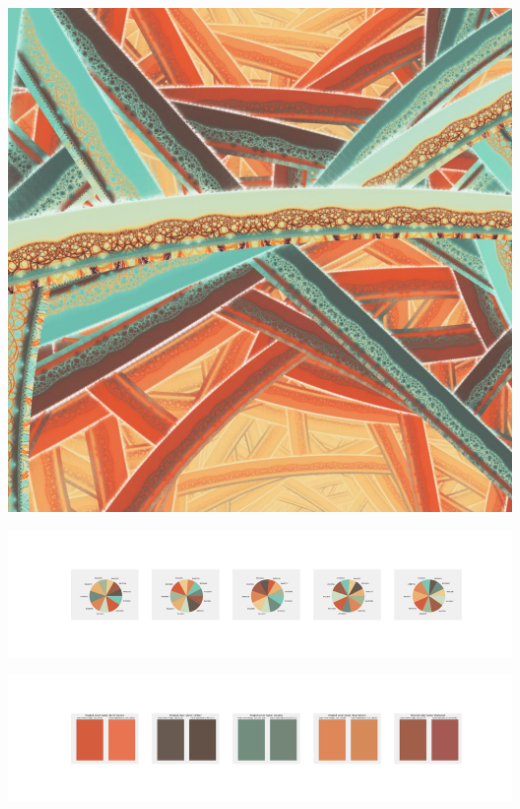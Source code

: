 \documentclass[11pt]{article}
\begin{document}
\begin{landscape}
    \begin{center}
    \includegraphics[width=\textwidth]{./nbimg/file (395).jpg}
    \end{center}

    \begin{center}
    \includegraphics[width=250mm]{./nbimg/pie-328.jpg}
    \end{center}

    \begin{center}
    \includegraphics[width=250mm]{./nbimg/peak-328.jpg}
    \end{center}
    


\end{landscape}
\end{document}
